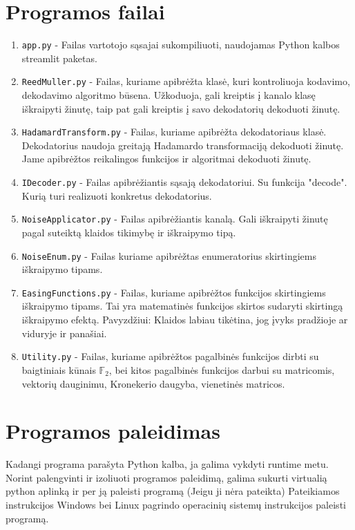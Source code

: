 \documentclass{article}
\begin{document}
\section{Programos failai}
\begin{enumerate}
    \item \texttt{app.py} - Failas vartotojo sąsajai sukompiliuoti, naudojamas
    Python kalbos streamlit paketas.
    \item \texttt{ReedMuller.py} - Failas, kuriame apibrėžta klasė, kuri kontroliuoja kodavimo, dekodavimo algoritmo būsena. Užkoduoja, gali kreiptis į kanalo klasę iškraipyti žinutę, taip pat gali kreiptis į savo dekodatorių dekoduoti žinutę.
    \item \texttt{HadamardTransform.py} - Failas, kuriame apibrėžta dekodatoriaus klasė. Dekodatorius naudoja greitają Hadamardo transformaciją dekoduoti žinutę. Jame apibrėžtos reikalingos funkcijos ir algoritmai dekoduoti žinutę.
    \item \texttt{IDecoder.py} - Failas apibrėžiantis sąsają dekodatoriui. Su funkcija "decode". Kurią turi realizuoti konkretus dekodatorius.
    \item \texttt{NoiseApplicator.py} - Failas apibrėžiantis kanalą. Gali iškraipyti žinutę pagal suteiktą klaidos tikimybę ir iškraipymo tipą.
    \item \texttt{NoiseEnum.py} - Failas kuriame apibrėžtas enumeratorius skirtingiems iškraipymo tipams.
    \item \texttt{EasingFunctions.py} - Failas, kuriame apibrėžtos funkcijos skirtingiems iškraipymo tipams. Tai yra matematinės funkcijos skirtos sudaryti skirtingą iškraipymo efektą. Pavyzdžiui: Klaidos labiau tikėtina, jog įvyks pradžioje ar viduryje ir panašiai.
    \item \texttt{Utility.py} - Failas, kuriame apibrėžtos pagalbinės funkcijos dirbti su baigtiniais kūnais $\mathbb{F}_2$, bei kitos pagalbinės funkcijos darbui su matricomis, vektorių dauginimu, Kronekerio daugyba, vienetinės matricos.
\end{enumerate}

\section{Programos paleidimas}
Kadangi programa parašyta Python kalba, ja galima vykdyti runtime metu. Norint palengvinti ir izoliuoti programos paleidimą, galima sukurti virtualią python aplinką ir per ją paleisti programą (Jeigu ji nėra pateikta)
Pateikiamos instrukcijos Windows bei Linux pagrindo operacinių sistemų instrukcijos paleisti programą.
\end{document}
